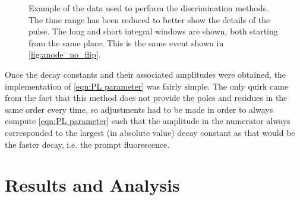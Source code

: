 \documentclass[11pt]{article}
\numberwithin{equation}{section}
\numberwithin{figure}{section}
\numberwithin{table}{section}
\begin{document}
\begin{figure}
    \caption{Example of the data used to perform the discrimination methods. The time range has been reduced to better show the details of the pulse. The long and short integral windows are shown, both starting from the same place. This is the same event shown in \cref{fig:anode_no_flip}.}
    \label{fig:anode_flipped}
\end{figure}

\par Once the decay constants and their associated amplitudes were obtained, the implementation of \cref{eqn:PL parameter} was fairly simple. The only quirk came from the fact that this method does not provide the poles and residues in the same order every time, so adjustments had to be made in order to always compute \cref{eqn:PL parameter} such that the amplitude in the numerator always corresponded to the largest (in absolute value) decay constant as that would be the faster decay, i.e. the prompt fluorescence. 

\section{Results and Analysis}\label{sec:Results and Analysis}
\end{document}
